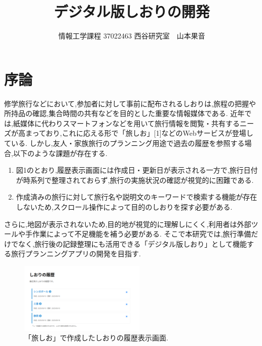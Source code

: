 \documentclass[a4j,twocolumn]{jsarticle}
\begin{document}
  \title{デジタル版しおりの開発}
  \author{情報工学課程 \hspace{5mm} 37022463 \hspace{5mm} 西谷研究室　山本果音}
  \date{}

  \maketitle
\maketitle




\section{序論}
\label{sec:org4e91291}
修学旅行などにおいて,参加者に対して事前に配布されるしおりは,旅程の把握や所持品の確認,集合時間の共有などを目的とした重要な情報媒体である.
近年では,紙媒体に代わりスマートフォンなどを用いて旅行情報を閲覧・共有するニーズが高まっており,これに応える形で「旅しお」[1]などのWebサービスが登場している.
しかし,友人・家族旅行のプランニング用途で過去の履歴を参照する場合,以下のような課題が存在する.
\begin{enumerate}
\item 図1のとおり,履歴表示画面には作成日・更新日が表示される一方で,旅行日付が時系列で整理されておらず,旅行の実施状況の確認が視覚的に困難である.
\item 作成済みの旅行に対して旅行名や説明文のキーワードで検索する機能が存在しないため,スクロール操作によって目的のしおりを探す必要がある.
\end{enumerate}
さらに,地図が表示されないため,目的地が視覚的に理解しにくく,利用者は外部ツールや手作業によって不足機能を補う必要がある.
そこで本研究では,旅行準備だけでなく,旅行後の記録整理にも活用できる「デジタル版しおり」として機能する旅行プランニングアプリの開発を目指す.

\begin{figure}[htbp]
\centering
\includegraphics[width=6cm]{./figs/shiori2.png}
\caption{\label{fig:org72aa08b}「旅しお」で作成したしおりの履歴表示画面.}
\end{figure}
\end{document}
